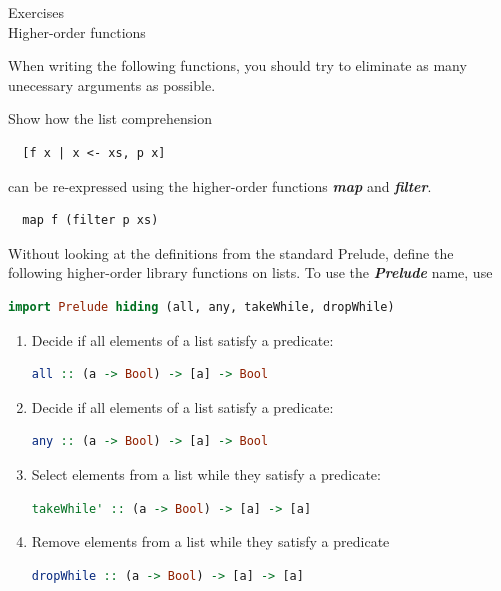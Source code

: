 \documentclass{article}
\newcommand\ExTitle{Higher-order functions}
\newcommand\fullExTitle{Exercises \\ \ExTitle }
\begin{document}
\begin{Huge}
	\begin{center}
	\fullExTitle
	\end{center}
 \end{Huge}
 When writing the following functions, you should try to eliminate as many unecessary arguments as possible.

\begin{exercise}

Show how the list comprehension \\
\begin{lstlisting}
  [f x | x <- xs, p x] 
\end{lstlisting}
can be re-expressed using the higher-order functions \textbf{\textit{map}} and \textbf{\textit{filter}}.
\end{exercise}

\begin{solution}
\begin{lstlisting}
  map f (filter p xs) 
\end{lstlisting}
\end{solution}

\begin{exercise} 
Without looking at the definitions from the standard Prelude, define the following higher-order library functions on lists. To use the \textbf{\textit{Prelude}} name, use 
\begin{lstlisting}[language=Haskell]
  import Prelude hiding (all, any, takeWhile, dropWhile)
\end{lstlisting}

\begin{enumerate}
	\item Decide if all elements of a list satisfy a predicate:
\begin{lstlisting}[language=Haskell]
all :: (a -> Bool) -> [a] -> Bool
\end{lstlisting}
	\item Decide if all elements of a list satisfy a predicate:
\begin{lstlisting}[language=Haskell]
any :: (a -> Bool) -> [a] -> Bool
\end{lstlisting}
	\item Select elements from a list while they satisfy a predicate:
\begin{lstlisting}[language=Haskell]
  takeWhile' :: (a -> Bool) -> [a] -> [a]
\end{lstlisting}
	\item Remove elements from a list while they satisfy a predicate
\begin{lstlisting}[language=Haskell]
dropWhile :: (a -> Bool) -> [a] -> [a]
\end{lstlisting}
\end{enumerate}
\end{exercise}
\end{document}
